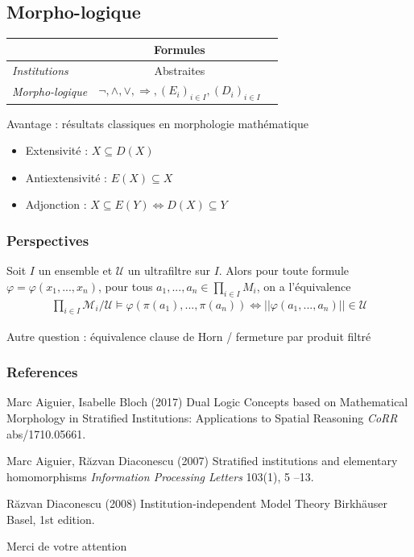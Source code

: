 \documentclass{beamer}
\newcommand{\gr}{\textbf}
\newcommand{\itemz}{\item[$\triangleright$]}
\newcommand{\il}{\textit}
\begin{document}
\subsection{Morpho-logique}

\begin{frame}
\begin{center}
\begin{tabular}{|l|c|c|}
  \hline
   & \gr{Formules} \\
  \hline
  \il{Institutions} & Abstraites \\
  \hline
  \il{Morpho-logique} & $\neg,\wedge,\vee,\Rightarrow,(E_i)_{i\in I},(D_i)_{i\in I}$ \\
  \hline
\end{tabular}
\end{center}
\pause
Avantage : résultats classiques en morphologie mathématique \\ 
\begin{itemize}
\itemz Extensivité : $X \subseteq D(X)$
\itemz Antiextensivité : $E(X) \subseteq X$
\itemz Adjonction : $X \subseteq E(Y) \Leftrightarrow D(X) \subseteq Y$
\end{itemize}
\end{frame}

\begin{frame}
\frametitle{Perspectives}
\pause
\begin{theorem}[\L o\'s]
Soit $I$ un ensemble et $\mathcal{U}$ un ultrafiltre sur $I$. Alors pour toute formule $\varphi = \varphi(x_1,...,x_n)$, pour tous $a_1,...,a_n \in \prod_{i\in I} M_i$, on a l'équivalence
\begin{align*}
 \prod_{i\in I} \mathcal{M}_i / \mathcal{U} \models \varphi(\pi(a_1),...,\pi(a_n)) \Longleftrightarrow ||\varphi(a_1,...,a_n)|| \in \mathcal{U}
\end{align*}
\end{theorem} \pause
Autre question : équivalence clause de Horn / fermeture par produit filtré
\end{frame}

\begin{frame}
\frametitle{References}
\footnotesize{
\begin{thebibliography}{99}
 Marc Aiguier, Isabelle Bloch (2017)
\newblock Dual Logic Concepts based on Mathematical Morphology in Stratified Institutions: Applications to Spatial Reasoning
\newblock \emph{CoRR} abs/1710.05661.

 Marc Aiguier, Răzvan Diaconescu (2007)
\newblock Stratified institutions and elementary homomorphisms
\newblock \emph{Information Processing Letters} 103(1), 5 --13.

 Răzvan Diaconescu (2008)
\newblock Institution-independent Model Theory
\newblock Birkhäuser Basel, 1st edition.

\end{thebibliography}
}
\end{frame}


\begin{frame}
\Huge{\centerline{Merci de votre attention}}
\end{frame}

\end{document}
